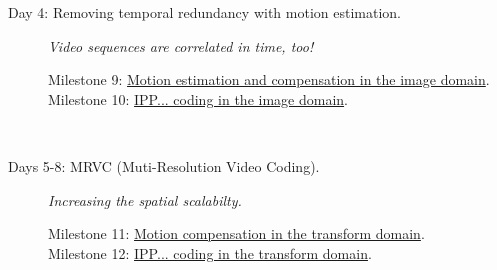 \begin{description}
\item [Day 4: {\normalfont Removing temporal redundancy with motion estimation.}]
  \emph{Video sequences are correlated in time, too!}
  \begin{description}
  \item [Milestone 9: {\normalfont \href{https://sistemas-multimedia.github.io/milestones/10-ME/}{Motion estimation and compensation in the image domain}.}]
  \item [Milestone 10: {\normalfont \href{https://sistemas-multimedia.github.io/milestones/11-image_domain_IPP/}{IPP... coding in the image domain}.}]
  \end{description}
  ~\newline

\item [Days 5-8: {\normalfont MRVC (Muti-Resolution Video Coding).}]
  \emph{Increasing the spatial scalabilty.}
  \begin{description}
  \item [Milestone 11: {\normalfont \href{https://sistemas-multimedia.github.io/milestones/12-transform_domain_MC/}{Motion compensation in the transform domain}.}]
  \item [Milestone 12: {\normalfont \href{https://sistemas-multimedia.github.io/milestones/13-transform_domain_IPP/}{IPP... coding in the transform domain}.}]
  \end{description}

\end{description}

